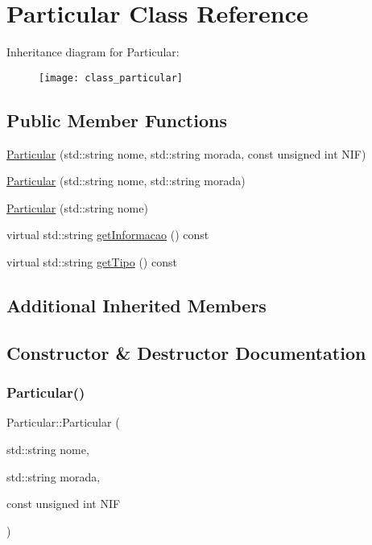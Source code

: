 \hypertarget{class_particular}{}\section{Particular Class Reference}
\label{class_particular}
Inheritance diagram for Particular\+:\begin{figure}[H]
\begin{center}
\leavevmode
\texttt{[image: class\_particular]}
\end{center}
\end{figure}
\subsection*{Public Member Functions}
\begin{DoxyCompactItemize}
\item 
\hyperlink{class_particular_a355034b30f29b3fecf6654de8d652aa7}{Particular} (std\+::string nome, std\+::string morada, const unsigned int N\+IF)
\item 
\hyperlink{class_particular_a794314799e022e8f05fda84af1722bc8}{Particular} (std\+::string nome, std\+::string morada)
\item 
\hyperlink{class_particular_a55ebdb7b32d55be44f903be5a4f4d6aa}{Particular} (std\+::string nome)
\item 
virtual std\+::string \hyperlink{class_particular_acde85dcb3d26ca3afe131fb4c35763c8}{get\+Informacao} () const
\item 
virtual std\+::string \hyperlink{class_particular_ac7fc22a792b8c711d5f424ad9af19755}{get\+Tipo} () const
\end{DoxyCompactItemize}
\subsection*{Additional Inherited Members}


\subsection{Constructor \& Destructor Documentation}
\mbox{\label{class_particular_a355034b30f29b3fecf6654de8d652aa7}} 
\subsubsection{\texorpdfstring{Particular()}{Particular()}\hspace{0.1cm}{\footnotesize\ttfamily [1/3]}}
{\footnotesize\ttfamily Particular\+::\+Particular (\begin{DoxyParamCaption}\item[{std\+::string}]{nome,  }\item[{std\+::string}]{morada,  }\item[{const unsigned int}]{N\+IF }\end{DoxyParamCaption})}

